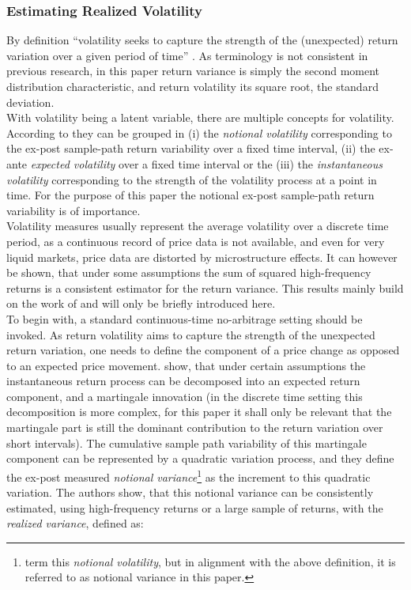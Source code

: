\subsubsection{Estimating Realized Volatility}\label{sec:221RV}
By definition ``volatility seeks to capture the strength of the (unexpected) return variation over a given period of time'' \parencite[p.7]{andersen2001}. As terminology is not consistent in previous research, in this paper return variance is simply the second moment distribution characteristic, and return volatility its square root, the standard deviation. \\
With volatility being a latent variable, there are multiple concepts for volatility. According to \textcite{andersen2001} they can be grouped in (i) the \emph{notional volatility} corresponding to the ex-post sample-path return variability over a fixed time interval, (ii) the ex-ante \emph{expected volatility} over a fixed time interval or the (iii) the \emph{instantaneous volatility} corresponding to the strength of the volatility process at a point in time. For the purpose of this paper the notional ex-post sample-path return variability is of importance.\\
Volatility measures usually represent the average volatility over a discrete time period, as a continuous record of price data is not available, and even for very liquid markets, price data are distorted by microstructure effects. It can however be shown, that under some assumptions the sum of squared high-frequency returns is a consistent estimator for the return variance. This results mainly build on the work of \textcite{andersen2001} and will only be briefly introduced here.\\
To begin with, a standard continuous-time no-arbitrage setting should be invoked. As return volatility aims to capture the strength of the unexpected return variation, one needs to define the component of a price change as opposed to an expected price movement. \textcite{andersen2001} show, that under certain assumptions the instantaneous return process can be decomposed into an expected return component, and a martingale innovation (in the discrete time setting this decomposition is more complex, for this paper it shall only be relevant that the martingale part is still the dominant contribution to the return variation over short intervals). The cumulative sample path variability of this martingale component can be represented by a quadratic variation process, and they define the ex-post measured \emph{notional variance}\footnote{\textcite{andersen2001} term this \emph{notional volatility}, but in alignment with the above definition, it is referred to as notional variance in this paper.} as the increment to this quadratic variation. The authors show, that this notional variance can be consistently estimated, using high-frequency returns or a large sample of returns, with the \emph{realized variance}, defined as:
